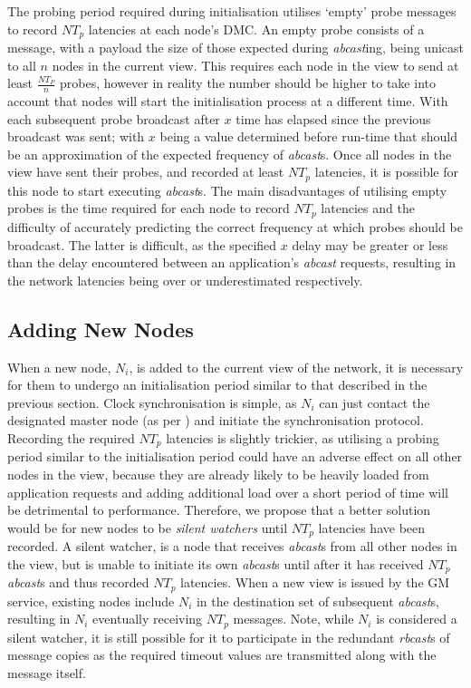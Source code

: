     The probing period required during initialisation utilises \textquoteleft{}empty' probe messages to record $NT_p$ latencies at each node's DMC.  An empty probe consists of a message, with a payload the size of those expected during \emph{abcast}ing, being unicast to all $n$ nodes in the current view.  This requires each node in the view to send at least $\frac{NT_P}{n}$ probes, however in reality the number should be higher to take into account that nodes will start the initialisation process at a different time.  With each subsequent probe broadcast after $x$ time has elapsed since the previous broadcast was sent; with $x$ being a value determined before run-time that should be an approximation of the expected frequency of \emph{abcast}s.  Once all nodes in the view have sent their probes, and recorded at least $NT_p$ latencies, it is possible for this node to start executing \emph{abcast}s.  The main disadvantages of utilising empty probes is the time required for each node to record $NT_p$ latencies and the difficulty of accurately predicting the correct frequency at which probes should be broadcast.  The latter is difficult, as the specified $x$ delay may be greater or less than the delay encountered between an application's \emph{abcast} requests, resulting in the network latencies being over or underestimated respectively.  
    
\subsection*{Adding New Nodes}
    When a new node, $N_i$, is added to the current view of the network, it is necessary for them to undergo an initialisation period similar to that described in the previous section.  Clock synchronisation is simple, as $N_i$ can just contact the designated master node (as per \citep{Cristian:1996:SA:227210.227231}) and initiate the synchronisation protocol.  Recording the required $NT_p$ latencies is slightly trickier, as utilising a probing period similar to the initialisation period could have an adverse effect on all other nodes in the view, because they are already likely to be heavily loaded from application requests and adding additional load over a short period of time will be detrimental to performance.  Therefore, we propose that a better solution would be for new nodes to be \emph{silent watchers} until $NT_p$ latencies have been recorded.  A silent watcher, is a node that receives \emph{abcast}s from all other nodes in the view, but is unable to initiate its own \emph{abcast}s until after it has received $NT_p$ \emph{abcast}s and thus recorded $NT_p$ latencies.  When a new view is issued by the GM service, existing nodes include $N_i$ in the destination set of subsequent \emph{abcast}s, resulting in $N_i$ eventually receiving $NT_p$ messages.  Note, while $N_i$ is considered a silent watcher, it is still possible for it to participate in the redundant \emph{rbcast}s of message copies as the required timeout values are transmitted along with the message itself.  

